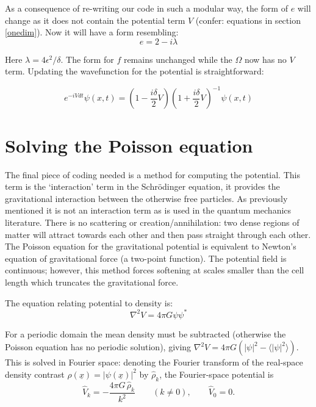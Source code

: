 As a consequence of re-writing our code in such a modular way, the form of $e$ will change as it does not contain the potential term $V$ (confer: equations in section \ref{onedim}). Now it will have a form resembling:
\begin{equation}
e = 2 - i\lambda
\end{equation}

\noindent Here $\lambda = 4\epsilon^2/\delta$. The form for $f$ remains unchanged while the $\Omega$ now has no $V$ term. Updating the wavefunction for the potential is straightforward:

\begin{equation}
e^{-i V dt} \psi(x, t) = (1 -\frac{i\delta}{2}V)(1 +\frac{i\delta}{2}V)^{-1} \psi(x, t)
\end{equation}


\section{Solving the Poisson equation}
\label{sol_poi}
The final piece of coding needed is a method for computing the potential. This term is the `interaction' term in the Schr\"odinger equation, it provides the gravitational interaction between the otherwise free particles. As previously mentioned it is not an interaction term as is used in the quantum mechanics literature. There is no scattering or creation/annihilation: two dense regions of matter will attract towards each other and then pass straight through each other. The Poisson equation for the gravitational potential is equivalent to Newton's equation of gravitational force (a two-point function). The potential field is continuous; however, this method forces softening at scales smaller than the cell length which truncates the gravitational force.

The equation relating potential to density is:
\begin{equation}
 \nabla^2 V =  4\pi G \psi\psi^*
\end{equation}

\noindent For a periodic domain the mean density must be subtracted (otherwise the Poisson equation has no periodic solution), giving $\nabla^2 V = 4\pi G (|\psi|^2 - \langle|\psi|^2\rangle)$. This is solved in Fourier space: denoting the Fourier transform of the real-space density contrast $\rho(\underline{x}) = |\psi(\underline{x})|^2$ by $\hat{\rho}_k$, the Fourier-space potential is
\begin{equation}
\hat{V}_k = -\frac{4\pi G\, \hat{\rho}_k}{k^2} \qquad (k \ne 0), \qquad \hat{V}_0 = 0.
\end{equation}

